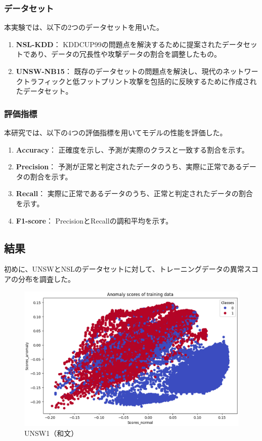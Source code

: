 \documentclass{css}
\begin{document}
\subsubsection{データセット}
本実験では、以下の2つのデータセットを用いた。

\begin{enumerate}
    \item \textbf{NSL-KDD}：
        KDDCUP99の問題点を解決するために提案されたデータセットであり、データの冗長性や攻撃データの割合を調整したもの。
    \item \textbf{UNSW-NB15}：
        既存のデータセットの問題点を解決し、現代のネットワークトラフィックと低フットプリント攻撃を包括的に反映するために作成されたデータセット。
\end{enumerate}

\subsubsection{評価指標}
本研究では、以下の4つの評価指標を用いてモデルの性能を評価した。

\begin{enumerate}
    \item \textbf{Accuracy}：
        正確度を示し、予測が実際のクラスと一致する割合を示す。
    \item \textbf{Precision}：
        予測が正常と判定されたデータのうち、実際に正常であるデータの割合を示す。
    \item \textbf{Recall}：
        実際に正常であるデータのうち、正常と判定されたデータの割合を示す。
    \item \textbf{F1-score}：
        PrecisionとRecallの調和平均を示す。
\end{enumerate}

\subsection{結果}

初めに、UNSWとNSLのデータセットに対して、トレーニングデータの異常スコアの分布を調査した。

\begin{figure}[tb]
    \centering
    \includegraphics[width=\linewidth]{pictures/eps/UNSW1.eps}
    \caption{UNSW1（和文）}
    \label{fig:UNSW1}
\end{figure}
\end{document}
